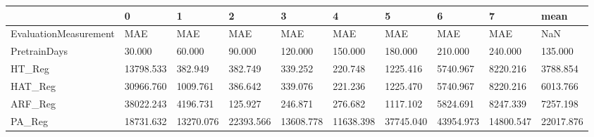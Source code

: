 \begin{tabular}{llllllllll}
\toprule
{} &         0 &         1 &         2 &         3 &         4 &         5 &         6 &         7 &      mean \\
\midrule
EvaluationMeasurement &       MAE &       MAE &       MAE &       MAE &       MAE &       MAE &       MAE &       MAE &       NaN \\
PretrainDays          &    30.000 &    60.000 &    90.000 &   120.000 &   150.000 &   180.000 &   210.000 &   240.000 &   135.000 \\
HT\_Reg                & 13798.533 &   382.949 &   382.749 &   339.252 &   220.748 &  1225.416 &  5740.967 &  8220.216 &  3788.854 \\
HAT\_Reg               & 30966.760 &  1009.761 &   386.642 &   339.076 &   221.236 &  1225.470 &  5740.967 &  8220.216 &  6013.766 \\
ARF\_Reg               & 38022.243 &  4196.731 &   125.927 &   246.871 &   276.682 &  1117.102 &  5824.691 &  8247.339 &  7257.198 \\
PA\_Reg                & 18731.632 & 13270.076 & 22393.566 & 13608.778 & 11638.398 & 37745.040 & 43954.973 & 14800.547 & 22017.876 \\
\bottomrule
\end{tabular}
